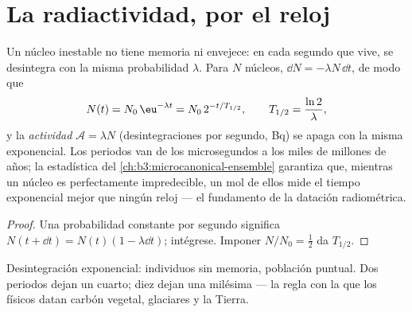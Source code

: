 \section{La radiactividad, por el reloj}

\begin{theorem}\label{thm:b3:nuclear-physics:decay}
Un núcleo inestable no tiene memoria ni envejece: en cada segundo que
vive, se desintegra con la misma probabilidad $\lambda$. Para $N$
núcleos, $\dd N = -\lambda N\,\dd t$, de modo que
\[
N(t) = N_0\,\eu^{-\lambda t} = N_0\,2^{-t/T_{1/2}} ,
\qquad T_{1/2} = \frac{\ln2}{\lambda} ,
\]
y la \emph{actividad} $\mathcal A = \lambda N$ (desintegraciones por
segundo, \unit{Bq}) se apaga con la misma exponencial. Los periodos van
de los microsegundos a los miles de millones de años; la estadística del
\cref{ch:b3:microcanonical-ensemble} garantiza que, mientras un
núcleo es perfectamente impredecible, un mol de ellos mide el
tiempo exponencial mejor que ningún reloj --- el fundamento de la
datación radiométrica.
\end{theorem}

\begin{proof}
Una probabilidad constante por segundo significa $N(t + \dd t) = N(t)(1 -
\lambda\dd t)$; intégrese. Imponer $N/N_0 = \tfrac12$ da
$T_{1/2}$.
\end{proof}

\begin{omfigure}

{\small Desintegración exponencial: individuos sin memoria, población
puntual. Dos periodos dejan un cuarto; diez dejan una
milésima --- la regla con la que los físicos datan carbón vegetal,
glaciares y la Tierra.}
\end{omfigure}

